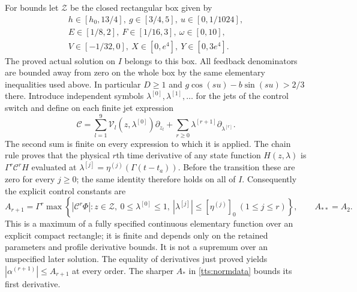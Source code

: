 For bounds let $\mathcal Z$ be the closed rectangular box given
by
\[
 \begin{gathered}
 h\in[h_0,13/4],\ g\in[3/4,5],\ u\in[0,1/1024],\\
 E\in[1/8,2],\ F\in[1/16,3],\ \omega\in[0,10],\\
 V\in[-1/32,0],\ X\in[0,e^4],\ Y\in[0,3e^4].
 \end{gathered}
\]
The proved actual solution on $I$ belongs to this box. All
feedback denominators are bounded away from zero on the whole
box by the same elementary inequalities used above. In particular
$D\geq1$ and $g\cos(su)-b\sin(su)>2/3$ there. Introduce
independent symbols $\lambda^{[0]},\lambda^{[1]},\ldots$ for the jets
of the control switch and define on each finite jet expression
\begin{equation}\label{tts:jetderivation}
 \mathcal C=
 \sum_{l=1}^9\mathcal V_l(z,\lambda^{[0]})\partial_{z_l}
             +\sum_{r\geq0}\lambda^{[r+1]}\partial_{\lambda^{[r]}}.
\end{equation}
The second sum is finite on every expression to which it is applied.
The chain rule proves that the physical $r$th time derivative of
any state function $H(z,\lambda)$ is
$\Gamma^r\mathcal C^rH$ evaluated at
$\lambda^{[j]}=\eta^{(j)}(\Gamma(t-t_a))$. Before the transition
these are zero for every $j\geq0$;
the same identity therefore holds on all of $I$.
Consequently the explicit control constants are
\begin{equation}\label{tts:controljets}
 A_{r+1}=\Gamma^r
 \max\left\{|\mathcal C^r\Phi|:
 z\in\mathcal Z,\ 0\leq\lambda^{[0]}\leq1,
 \ |\lambda^{[j]}|\leq[\eta^{(j)}]_0\ (1\leq j\leq r)\right\},
 \qquad A_{**}=A_2.
\end{equation}
This is a maximum of a fully specified continuous elementary
function over an explicit compact rectangle; it is finite and
depends only on the retained parameters and profile derivative
bounds. It is not a supremum over an unspecified later solution.
The equality of derivatives just proved yields
$|\alpha^{(r+1)}|\leq A_{r+1}$ at every order. The sharper
$A_*$ in \eqref{tts:normdata} bounds its first derivative.

